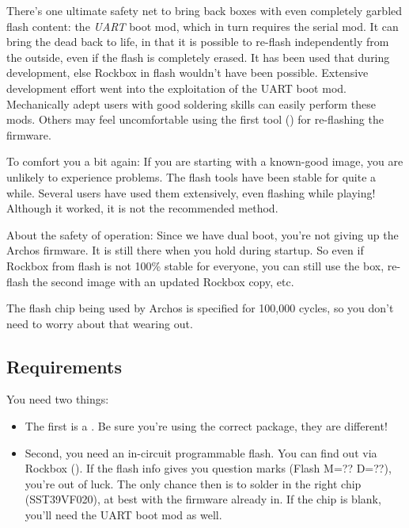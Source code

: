 
There's one ultimate safety net to bring back boxes with even completely 
garbled flash content: the \emph{UART} boot mod, which in turn requires the 
serial mod. It can bring the dead back to life, in that it is possible to 
re-flash independently from the outside, even if the flash is completely erased.
It has been used that during development, else Rockbox in flash wouldn't have 
been possible. Extensive development effort went into the exploitation of the 
UART boot mod. Mechanically adept users with good soldering skills can easily 
perform these mods. Others may feel uncomfortable using the first tool 
() for re-flashing the firmware.


To comfort you a bit again: If you are starting with a known-good image, you 
are unlikely to experience problems. The flash tools have been stable for quite
a while. Several users have used them extensively, even flashing while playing!
Although it worked, it is not the recommended method.

About the safety of operation: Since we have dual boot, you're not giving up 
the Archos firmware. It is still there when you hold
 during startup. So even if Rockbox from flash is not 100\% stable for
everyone, you can still use the box, re-flash the second image with an updated 
Rockbox copy, etc.

The flash chip being used by Archos is specified for 100,000 cycles, so you don't need to worry about that wearing out.

\subsection{Requirements}
You need two things:
\begin{itemize}
\item The first is a \playername. Be sure you're using the correct package, 
  they are different!
\item Second, you need an in-circuit programmable flash.  You can find out via Rockbox (). If the flash info gives you question marks (Flash M=?? D=??), 
  you're out of luck. The only chance then is to solder in the right chip 
  (SST39VF020), at best with the firmware already in. If the chip is blank, 
  you'll need the UART boot mod as well.
\end{itemize}

